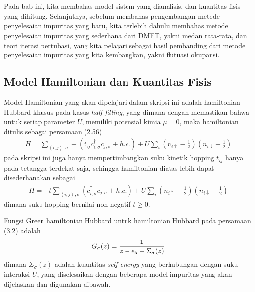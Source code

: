 \chapter{\babTiga}

Pada bab ini, kita membahas model sistem yang dianalisis, dan kuantitas fisis yang dihitung. Selanjutnya, sebelum membahas pengembangan metode penyelesaian impuritas yang baru, kita terlebih dahulu membahas metode penyelesaian impuritas yang sederhana dari DMFT, yakni medan rata-rata, dan teori iterasi pertubasi, yang kita pelajari sebagai hasil pembanding dari metode penyelesaian impuritas yang kita kembangkan, yakni flutuasi okupansi.

\section{Model Hamiltonian dan Kuantitas Fisis}

Model Hamiltonian yang akan dipelajari dalam skripsi ini adalah hamiltonian Hubbard khusus pada kasus \textit{half-filling}, yang dimana dengan memastikan bahwa untuk setiap parameter $U$, memiliki potensial kimia $\mu = 0$, maka hamiltonian ditulis sebagai persamaan (2.56)
\begin{align}
H = \sum_{\left< i,j \right> , \sigma} -\left(t_{ij} c^\dagger_{i,\sigma}c_{j,\sigma} + h.c. \right) + U \sum_i \left( n_{i\uparrow} - \frac{1}{2}\right) \left(n_{i\downarrow} - \frac{1}{2} \right)
\end{align}
pada skripsi ini juga hanya mempertimbangkan suku kinetik hopping $t_{ij}$ hanya pada tetangga terdekat saja, sehingga hamiltonian diatas lebih dapat disederhanakan sebagai
\begin{align}
H = -t\sum_{\left< i,j \right> , \sigma} \left( c^\dagger_{i,\sigma}c_{j,\sigma} + h.c. \right) + U \sum_i \left( n_{i\uparrow} - \frac{1}{2}\right) \left(n_{i\downarrow} - \frac{1}{2} \right)
\end{align}
dimana suku hopping bernilai non-negatif $t \geq 0$. 

Fungsi Green hamiltonian Hubbard untuk hamiltonian Hubbard pada persamaan (3.2) adalah
\begin{align}
G_\sigma(z) = \frac{1}{z - \epsilon_{\textbf{k}} - \Sigma_\sigma(z)}
\end{align}
dimana $\Sigma_\sigma(z)$ adalah kuantitas \textit{self-energy} yang berhubungan dengan suku interaksi $U$, yang diselesaikan dengan beberapa model impuritas yang akan dijelaskan dan digunakan dibawah.

